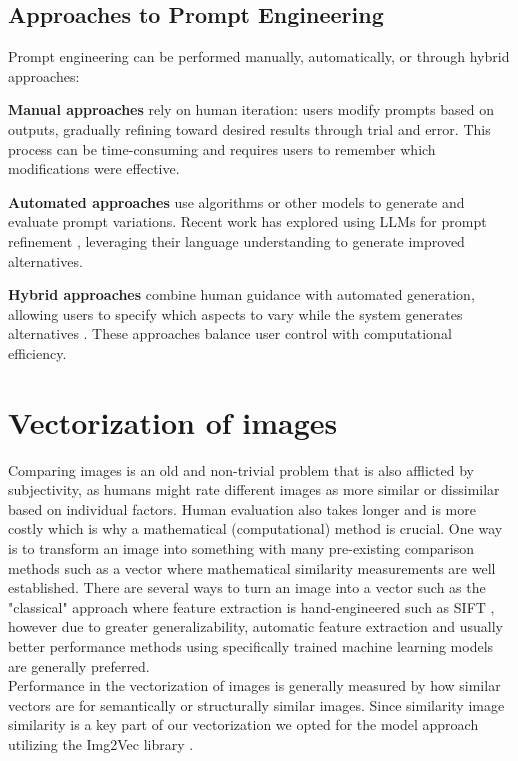 \documentclass[
  a4paper,  %
  twoside,  %
  bibliography=totoc,
  headsepline,
  cleardoublepage=empty,
  parskip=half,
  draft=false
]{scrbook}
\begin{document}
\subsection{Approaches to Prompt Engineering}

Prompt engineering can be performed manually, automatically, or through hybrid approaches:

\textbf{Manual approaches} rely on human iteration: users modify prompts based on outputs, gradually refining toward desired results through trial and error. This process can be time-consuming and requires users to remember which modifications were effective.

\textbf{Automated approaches} use algorithms or other models to generate and evaluate prompt variations. Recent work has explored using LLMs for prompt refinement \cite{10.1145/3729176.3729203,You2024Aesthetic}, leveraging their language understanding to generate improved alternatives.

\textbf{Hybrid approaches} combine human guidance with automated generation, allowing users to specify which aspects to vary while the system generates alternatives \cite{PromptMagician,mishra2025promptaidpromptexplorationperturbation,brade2023promptifytexttoimagegenerationinteractive}. These approaches balance user control with computational efficiency.





\section{Vectorization of images}
\label{sec:vecImg}
Comparing images is an old and non-trivial problem that is also afflicted by subjectivity, as humans might rate different images as more similar or dissimilar based on individual factors. Human evaluation also takes longer and is more costly which is why a mathematical (computational) method is crucial. 
One way is to transform an image into something with many pre-existing comparison methods such as a vector where mathematical similarity measurements are well established. There are several ways to turn an image into a vector such as the "classical" approach where feature extraction is hand-engineered such as SIFT \cite{inbook}, however due to greater generalizability, automatic feature extraction and usually better performance methods using specifically trained machine learning models are generally preferred.\\ Performance in the vectorization of images is generally measured by how similar vectors are for semantically or structurally similar images. Since similarity image similarity is a key part of our vectorization we opted for the model approach utilizing the Img2Vec library \cite{patel2019img2vec}.
\end{document}
